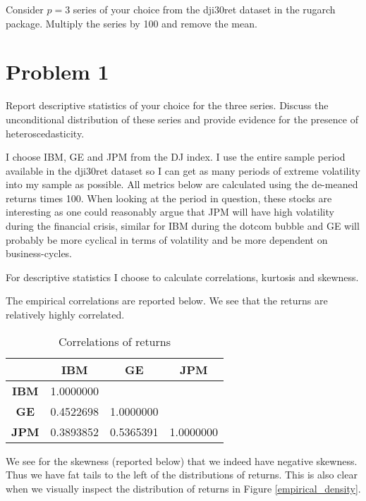 \documentclass{EconHomework}
\begin{document}
Consider $p=3$ series of your choice from the dji30ret dataset in the rugarch package. Multiply the series by 100 and remove the mean.

\section{Problem 1}
\begin{tcolorbox}[colback=white]
    Report descriptive statistics of your choice for the three series. Discuss the unconditional distribution of these series and provide evidence for the presence of heteroscedasticity.
\end{tcolorbox}

I choose IBM, GE and JPM from the DJ index. I use the entire sample period available in the dji30ret dataset so I can get as many periods of extreme volatility into my sample as possible. All metrics below are calculated using the de-meaned returns times 100. When looking at the period in question, these stocks are interesting as one could reasonably argue that JPM will have high volatility during the financial crisis, similar for IBM during the dotcom bubble and GE will probably be more cyclical in terms of volatility and be more dependent on business-cycles.

\bigskip

For descriptive statistics I choose to calculate correlations, kurtosis and skewness.

\bigskip

The empirical correlations are reported below. We see that the returns are relatively highly correlated.


\begin{table}[H]
    \centering
    \begin{tabular}{ c | c c c }
        & \textbf{IBM} & \textbf{GE} & \textbf{JPM} \\
        \hline
        \textbf{IBM} & 1.0000000 &  & \\
        \textbf{GE} & 0.4522698 & 1.0000000 & \\
        \textbf{JPM} & 0.3893852 & 0.5365391 & 1.0000000 \\
    \end{tabular}
    \caption{Correlations of returns}
\end{table}

We see for the skewness (reported below) that we indeed have negative skewness. Thus we have fat tails to the left of the distributions of returns. This is also clear when we visually inspect the distribution of returns in Figure \ref{empirical_density}.
\end{document}
